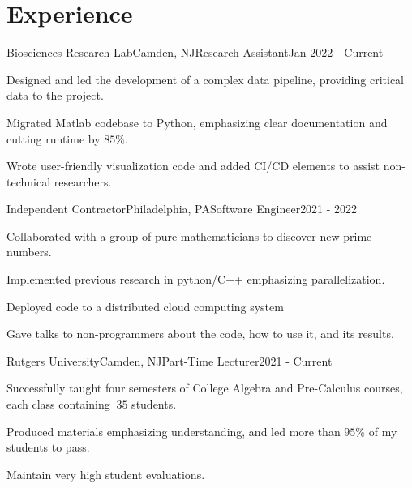 \thispagestyle{empty}

\section{Experience}

\begin{role}{Biosciences Research Lab}{Camden, NJ}{Research Assistant}{Jan 2022 - Current}
  \item Designed and led the development of a complex data pipeline, providing critical data to the project.
  \item Migrated Matlab codebase to Python, emphasizing clear documentation and cutting runtime by $85\%$.
  \item Wrote user-friendly visualization code and added CI/CD elements to assist non-technical researchers.
\end{role}

\begin{role}{Independent Contractor}{Philadelphia, PA}{Software Engineer}{2021 - 2022}
  \item Collaborated with a group of pure mathematicians to discover new prime numbers.
  \item Implemented previous research in python/C++ emphasizing parallelization.
  \item Deployed code to a distributed cloud computing system
  \item Gave talks to non-programmers about the code, how to use it, and its results.
\end{role}

\begin{role}{Rutgers University}{Camden, NJ}{Part-Time Lecturer}{2021 - Current}
\item Successfully taught four semesters of College Algebra and Pre-Calculus courses, each class containing $~35$ students. 
\item Produced materials emphasizing understanding, and led more than $95\%$ of my students to pass.
\item Maintain very high student evaluations.  
\end{role}

